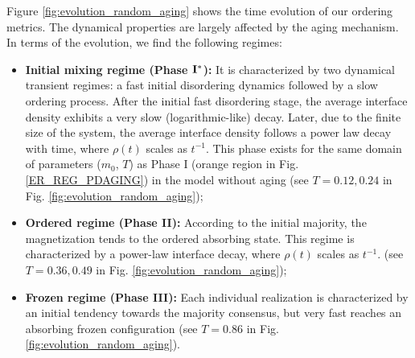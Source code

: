 Figure \ref{fig:evolution_random_aging} shows the time evolution of our ordering metrics. The dynamical properties are largely affected by the aging mechanism. In terms of the evolution, we find the following regimes:
\begin{itemize}
    \item \textbf{Initial mixing regime (Phase ${\rm {\bf I}}^{*}$):} It is characterized by two dynamical transient regimes: a fast initial disordering dynamics followed by a slow ordering process. After the initial fast disordering stage, the average interface density exhibits a very slow (logarithmic-like) decay. Later, due to the finite size of the system, the average interface density follows a power law decay with time, where $\rho(t)$ scales as $t^{-1}$. This phase exists for the same domain of parameters ($m_0$, $T$) as Phase I (orange region in Fig. \ref{ER_REG_PDAGING}) in the model without aging (see $T = 0.12, 0.24$ in Fig. \ref{fig:evolution_random_aging});
    \item \textbf{Ordered regime (Phase II):} According to the initial majority, the magnetization tends to the ordered absorbing state. This regime is characterized by a power-law interface decay, where $\rho(t)$ scales as $t^{-1}$. (see $T = 0.36, 0.49$ in Fig. \ref{fig:evolution_random_aging});
    \item \textbf{Frozen regime (Phase III):} Each individual realization is characterized by an initial tendency towards the majority consensus, but very fast reaches an absorbing frozen configuration (see $T = 0.86$ in Fig. \ref{fig:evolution_random_aging}).
\end{itemize}
